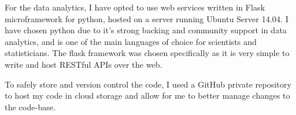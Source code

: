 For the data analytics, I have opted to use web services written in Flask microframework for python, hosted on a server running Ubuntu Server 14.04. 
I have chosen python due to it's strong backing and community support in data analytics, and is one of the main languages of choice for scientists and statisticians.
The flask framework was chosen specifically as it is very simple to write and host RESTful APIs over the web.

To safely store and version control the code, I used a GitHub private repository to host my code in cloud storage and allow for me to better manage changes to the code-base. 
